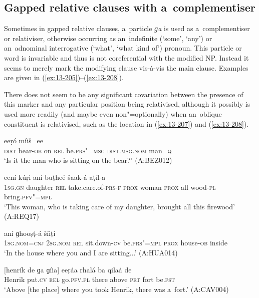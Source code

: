 \subsection{Gapped relative clauses with a~complementiser}
\label{subsec:13-6-4}


Sometimes in gapped relative clauses, a~particle \textit{ɡa} is used as a~complementiser or relativiser, otherwise occurring as an~indefinite (`some', `any') or an~adnominal interrogative (`what', `what kind of') pronoun. This particle or word is invariable and thus is not coreferential with the modified NP. Instead it seems to merely mark the modifying clause vis-à-vis the main clause. Examples are given in (\ref{ex:13-205})--(\ref{ex:13-208}).


There does not seem to be any significant covariation between the presence of this marker and any particular position being relativised, although it possibly is used more readily (and maybe even non"=optionally) when an~oblique constituent is relativised, such as the location in (\ref{ex:13-207}) and (\ref{ex:13-208}). 

\begin{exe}
\ex
\label{ex:13-205}
 eeṛó  míiš=ee \\
\textsc{dist} bear-\textsc{ob} on \textsc{rel} be.\textsc{prs"=msg} \textsc{dist.msg.nom}   man=\textsc{q} \\
\glt `Is it the man who is sitting on the bear?' (A:BEZ012)

\ex
\label{ex:13-206}
 eení kúṛi  aní buṭheé šaak-á aṭíl-a \\
\textsc{1sg.gn} daughter \textsc{rel} take.care.of-\textsc{prs-f} \textsc{prox} woman \textsc{prox} all wood-\textsc{pl} bring.\textsc{pfv"=mpl} \\
\glt `This woman, who is taking care of my daughter, brought all this firewood' (A:REQ17)

\ex
\label{ex:13-207}
\gll [máa=ee tu ɡa bheš-í hín-a]  aní ɡhooṣṭ-á šíiṭi \\
\textsc{1sg.nom=cnj} \textsc{2sg.nom} \textsc{rel} sit.down-\textsc{cv} be.\textsc{prs"=mpl} \textsc{prox} house-\textsc{ob} inside  \\
\glt `In the house where you and I are sitting...' (A:HUA014)

\ex
\label{ex:13-208}
\gll \label{bkm:Ref190845659}[henrík de ɡa ɡíia] eeṛáa rhalá ba  qilaá de \\
Henrik put.\textsc{cv} \textsc{rel} go.\textsc{pfv.pl}  there above \textsc{prt} fort be.\textsc{pst } \\
\glt `Above [the place] where you took Henrik, there was a~fort.' (A:CAV004) 
\end{exe}

